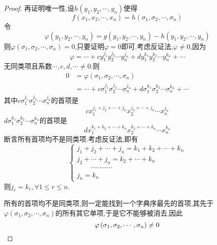 {\begin{proof}
        再证明唯一性,设$h\left(
            y_1,y_2,\cdots,y_n
            \right)$使得
        \[
            f\left(
            x_1,x_2,\cdots,x_n
            \right)=h\left(
            \sigma_1,\sigma_2,\cdots,\sigma_n
            \right)
        \]令
        \[
            \varphi\left(
            y_1,y_2,\cdots,y_n
            \right)=g\left(
            y_1,y_2,\cdots,y_n
            \right)-h\left(
            y_1,y_2,\cdots,y_n
            \right)
        \]则$
            \varphi\left(
            \sigma_1,\sigma_2,\cdots,\sigma_n
            \right)=0
        $,只要证明$\varphi=0$即可.考虑反证法,$\varphi\neq 0$,因为
        \[
            \varphi =
            \cdots+c y_1^{j_1}y_2^{j_2}\cdots y_n^{j_n}+d y_1^{k_1}y_2^{k_2}\cdots y_n^{k_n}+\cdots
        \]
        无同类项且系数$\cdots,c,d,\cdots\neq 0$.则
        \begin{align*}
            0 & =\varphi\left(
            \sigma_1,\sigma_2,\cdots,\sigma_n
            \right)                                                                                                                \\
              & =\cdots+c\sigma_1^{j_1}\sigma_2^{j_2}\cdots\sigma_n^{j_n}+d\sigma_1^{k_1}\sigma_2^{k_2}\cdots\sigma_n^{k_n}+\cdots
        \end{align*}
        其中$c\sigma_1^{j_1}
            \sigma_2^{j_2}\cdots\sigma_n^{j_n}
        $的首项是\[
            cx_1^{j_1+j_2+\cdots+j_n}x_2^{j_2+\cdots+j_n}\cdots x_n^{j_n}
        \]$d\sigma_1^{k_1}\sigma_2^{k_2}\cdots\sigma_n^{k_n}$的首项是\[
            dx_1^{k_1+k_2+\cdots+k_n}x_2^{k_2+\cdots+k_n}\cdots x_n^{k_n}\]断言所有首项均不是同类项.考虑反证法,即有
        \[
            \begin{cases*}
                j_1+j_2+\cdots+j_n=k_1+k_2+\cdots+k_n \\
                j_2+\cdots+j_n=k_2+\cdots+k_n         \\
                \qquad\cdots\cdots\cdots\cdots        \\
                j_n=k_n
            \end{cases*}
        \]则$j_r=k_r,\forall 1\leqslant r\leqslant n$.

        所有的首项均不是同类项,则一定能找到一个字典序最先的首项,其先于$\varphi
            \left(
            \sigma_1,\sigma_2,\cdots,\sigma_n
            \right)$的所有其它单项,于是它不能够被消去,因此\[
            \varphi\left(
            \sigma_1,\sigma_2,\cdots,\sigma_n
            \right)\neq 0
            \qedhere\]
    \end{proof}
}
